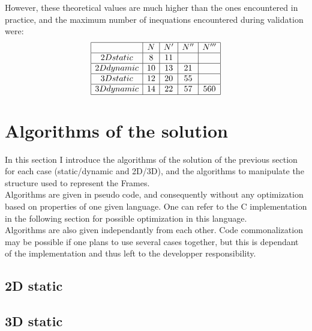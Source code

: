 \documentclass[12pt, a4paper]{article}
\begin{document}
However, these theoretical values are much higher than the ones encountered in practice, and the maximum number of inequations encountered during validation were:\\
$$
\begin{array}{|c|c|c|c|c|}
\hline
&N&N'&N''&N'''\\
\hline
2Dstatic&8&11&&\\
\hline
2Ddynamic&10&13&21&\\
\hline
3Dstatic&12&20&55&\\
\hline
3Ddynamic&14&22&57&560\\
\hline
\end{array}
$$

\section{Algorithms of the solution}

In this section I introduce the algorithms of the solution of the previous section for each case (static/dynamic and 2D/3D), and the algorithms to manipulate the structure used to represent the Frames.\\

Algorithms are given in pseudo code, and consequently without any optimization based on properties of one given language. One can refer to the C implementation in the following section for possible optimization in this language.\\

Algorithms are also given independantly from each other. Code commonalization may be possible if one plans to use several cases together, but this is dependant of the implementation and thus left to the developper responsibility.\\

\subsection{2D static}

\begin{scriptsize}
\begin{ttfamily}

\end{ttfamily}
\end{scriptsize}

\subsection{3D static}
\end{document}
